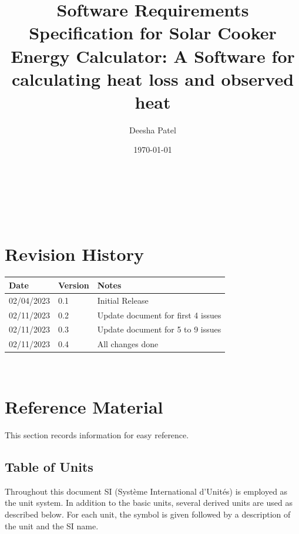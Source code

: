 \documentclass[12pt]{article}
\begin{document}
\title{Software Requirements Specification for Solar Cooker Energy Calculator: A Software for calculating heat loss and observed heat} 
\author{Deesha Patel}
\date{\today}
	
\maketitle

~\newpage


\tableofcontents

~\newpage

\section*{Revision History}

\begin{tabularx}{\textwidth}{p{3cm}p{2cm}X}
\toprule {\bf Date} & {\bf Version} & {\bf Notes}\\
\midrule
02/04/2023 & 0.1 & Initial Release\\
02/11/2023 & 0.2 & Update document for first 4 issues \\ 
02/11/2023 & 0.3 & Update document for 5 to 9 issues \\ 
02/11/2023 & 0.4 & All changes done \\
\bottomrule
\end{tabularx}

~\newpage

\section{Reference Material}

This section records information for easy reference.

\subsection{Table of Units}

Throughout this document SI (Syst\`{e}me International d'Unit\'{e}s) is employed
as the unit system.  In addition to the basic units, several derived units are
used as described below.  For each unit, the symbol is given followed by a
description of the unit and the SI name.
~\newline
\end{document}

